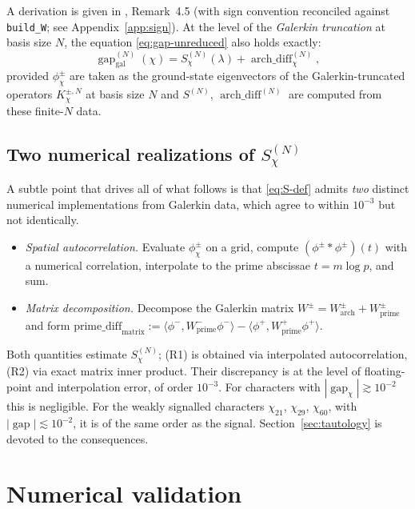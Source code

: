 \documentclass[10pt,twocolumn]{article}
\theoremstyle{definition}
\theoremstyle{remark}
\newcommand{\gap}{\operatorname{gap}}
\newcommand{\chifn}{\chi}
\newcommand{\archdiff}{\operatorname{arch\_diff}}
\begin{document}
A derivation is given in \cite{AnalyticKernel}, Remark~4.5 (with
sign convention reconciled against \texttt{build\_W}; see
Appendix~\ref{app:sign}). At the level of the \emph{Galerkin
truncation} at basis size $N$, the equation
\eqref{eq:gap-unreduced} also holds exactly:
\begin{equation}
\label{eq:gap-galerkin}
  \gap_{\mathrm{gal}}^{(N)}(\chifn)
    = S_{\chifn}^{(N)}(\lambda) + \archdiff_{\chifn}^{(N)},
\end{equation}
provided $\phi^\pm_{\chifn}$ are taken as the ground-state
eigenvectors of the Galerkin-truncated operators $K_{\chifn}^{\pm,
N}$ at basis size $N$ and $S^{(N)}$, $\archdiff^{(N)}$ are computed
from these finite-$N$ data.

\subsection{Two numerical realizations of \texorpdfstring{$S_{\chifn}^{(N)}$}{S}}
\label{sec:formula-two-realizations}

A subtle point that drives all of what follows is that
\eqref{eq:S-def} admits \emph{two} distinct numerical
implementations from Galerkin data, which agree to within $10^{-3}$
but not identically.
\begin{itemize}
  \item[(R1)] \emph{Spatial autocorrelation.} Evaluate
    $\phi_{\chifn}^\pm$ on a grid, compute $(\phi^\pm
    *\phi^\pm)(t)$ with a numerical correlation, interpolate to
    the prime abscissae $t=m\log p$, and sum.
  \item[(R2)] \emph{Matrix decomposition.} Decompose the Galerkin
    matrix $W^\pm=W^\pm_{\mathrm{arch}}+W^\pm_{\mathrm{prime}}$ and
    form
    $\mathrm{prime\_diff}_{\mathrm{matrix}}
      :=\langle\phi^-,W^-_{\mathrm{prime}}\phi^-\rangle
      -\langle\phi^+,W^+_{\mathrm{prime}}\phi^+\rangle$.
\end{itemize}
Both quantities estimate $S_{\chifn}^{(N)}$; (R1) is obtained via
interpolated autocorrelation, (R2) via exact matrix inner product.
Their discrepancy is at the level of floating-point and
interpolation error, of order $10^{-3}$. For characters with
$|\gap_{\chifn}|\gtrsim 10^{-2}$ this is negligible. For the weakly
signalled characters $\chifn_{21}$, $\chifn_{29}$, $\chifn_{60}$,
with $|\gap|\lesssim 10^{-2}$, it is of the same order as the
signal. Section~\ref{sec:tautology} is devoted to the consequences.

\section{Numerical validation}
\label{sec:validation}
\end{document}
